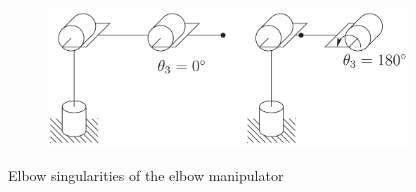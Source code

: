 \begin{frame}
\begin{columns}
\begin{column}{0.4\textwidth}
            \begin{figure}[bth]
                \centering
                \includegraphics[width=0.85\textwidth]{figures/elbow_singularities.png} 
            \end{figure}
            \vspace{-2mm}
            \centering
            \footnotesize{Elbow singularities of the elbow manipulator}
        \end{column}
    \end{columns}
\end{frame}


